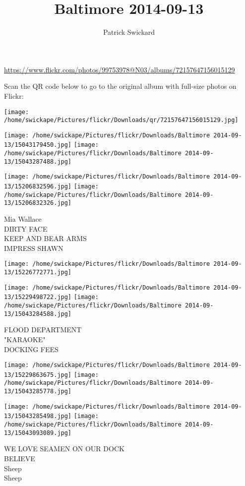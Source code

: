 \documentclass[10pt,letterpaper]{article}
\title{Baltimore 2014-09-13}
\author{Patrick Swickard}
\date{}
\begin{document}
\maketitle

\url{https://www.flickr.com/photos/99753978@N03/albums/72157647156015129}

Scan the QR code below to go to the original album with full-size photos on Flickr:

\texttt{[image: /home/swickape/Pictures/flickr/Downloads/qr/72157647156015129.jpg]}
\pagebreak

\texttt{[image: /home/swickape/Pictures/flickr/Downloads/Baltimore 2014-09-13/15043179450.jpg]}
\texttt{[image: /home/swickape/Pictures/flickr/Downloads/Baltimore 2014-09-13/15043287488.jpg]}

\texttt{[image: /home/swickape/Pictures/flickr/Downloads/Baltimore 2014-09-13/15206832596.jpg]}
\texttt{[image: /home/swickape/Pictures/flickr/Downloads/Baltimore 2014-09-13/15206832326.jpg]}

Mia Wallace\\
DIRTY FACE\\
KEEP AND BEAR ARMS\\
IMPRESS SHAWN
\pagebreak

\texttt{[image: /home/swickape/Pictures/flickr/Downloads/Baltimore 2014-09-13/15226772771.jpg]}

\vspace{0.25in}
\texttt{[image: /home/swickape/Pictures/flickr/Downloads/Baltimore 2014-09-13/15229498722.jpg]}
\texttt{[image: /home/swickape/Pictures/flickr/Downloads/Baltimore 2014-09-13/15043284588.jpg]}

FLOOD DEPARTMENT\\
"KARAOKE"\\
DOCKING FEES
\pagebreak

\texttt{[image: /home/swickape/Pictures/flickr/Downloads/Baltimore 2014-09-13/15229863675.jpg]}
\texttt{[image: /home/swickape/Pictures/flickr/Downloads/Baltimore 2014-09-13/15043285778.jpg]}

\texttt{[image: /home/swickape/Pictures/flickr/Downloads/Baltimore 2014-09-13/15043285498.jpg]}
\texttt{[image: /home/swickape/Pictures/flickr/Downloads/Baltimore 2014-09-13/15043093089.jpg]}

WE LOVE SEAMEN ON OUR DOCK\\
BELIEVE\\
Sheep\\
Sheep
\pagebreak
\end{document}
